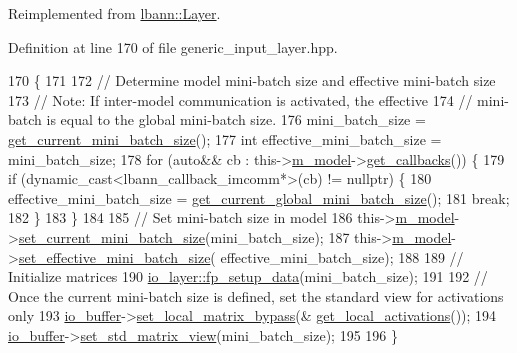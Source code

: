 Reimplemented from \hyperlink{classlbann_1_1Layer_af311d901a5f71e4c749454647e9fd9c7}{lbann\+::\+Layer}.



Definition at line 170 of file generic\+\_\+input\+\_\+layer.\+hpp.


\begin{DoxyCode}
170                                                    \{
171 
172     \textcolor{comment}{// Determine model mini-batch size and effective mini-batch size}
173     \textcolor{comment}{// Note: If inter-model communication is activated, the effective}
174     \textcolor{comment}{// mini-batch is equal to the global mini-batch size.}
176 \textcolor{comment}{}    mini\_batch\_size = \hyperlink{classlbann_1_1generic__input__layer_a41d278999fbd10d2cd95b9af04925cf7}{get\_current\_mini\_batch\_size}();
177     \textcolor{keywordtype}{int} effective\_mini\_batch\_size = mini\_batch\_size;
178     \textcolor{keywordflow}{for} (\textcolor{keyword}{auto}&& cb : this->\hyperlink{classlbann_1_1Layer_a3d9315e99574166f2f33e37b572021d2}{m\_model}->\hyperlink{classlbann_1_1model_a38c71a455870e087c4c07acb78e4477c}{get\_callbacks}()) \{
179       \textcolor{keywordflow}{if} (dynamic\_cast<lbann\_callback\_imcomm*>(cb) != \textcolor{keyword}{nullptr}) \{
180         effective\_mini\_batch\_size = \hyperlink{classlbann_1_1generic__input__layer_aaaa60fb7b94353fccaff25e6a862d833}{get\_current\_global\_mini\_batch\_size}();
181         \textcolor{keywordflow}{break};
182       \}
183     \}
184 
185     \textcolor{comment}{// Set mini-batch size in model}
186     this->\hyperlink{classlbann_1_1Layer_a3d9315e99574166f2f33e37b572021d2}{m\_model}->\hyperlink{classlbann_1_1model_a4f3cc91f8495870723389be15f77184a}{set\_current\_mini\_batch\_size}(mini\_batch\_size);
187     this->\hyperlink{classlbann_1_1Layer_a3d9315e99574166f2f33e37b572021d2}{m\_model}->\hyperlink{classlbann_1_1model_aa64829cba8a84928a396893172a1d116}{set\_effective\_mini\_batch\_size}(
      effective\_mini\_batch\_size);
188 
189     \textcolor{comment}{// Initialize matrices}
190     \hyperlink{classlbann_1_1Layer_af311d901a5f71e4c749454647e9fd9c7}{io\_layer::fp\_setup\_data}(mini\_batch\_size);
191 
192     \textcolor{comment}{// Once the current mini-batch size is defined, set the standard view for activations only}
193     \hyperlink{classlbann_1_1generic__input__layer_a9dfe8b9afaebc7a5bcb0177ee2ab428f}{io\_buffer}->\hyperlink{classlbann_1_1generic__io__buffer_af84c26ab5ee77d1d9ed9ea5d62823815}{set\_local\_matrix\_bypass}(&
      \hyperlink{classlbann_1_1Layer_a4248f27acebf72b7b7b3ee39c8bcb62a}{get\_local\_activations}());
194     \hyperlink{classlbann_1_1generic__input__layer_a9dfe8b9afaebc7a5bcb0177ee2ab428f}{io\_buffer}->\hyperlink{classlbann_1_1generic__io__buffer_a458d9bf722effce4177a0ac0aee9124f}{set\_std\_matrix\_view}(mini\_batch\_size);
195 
196   \}
\end{DoxyCode}
